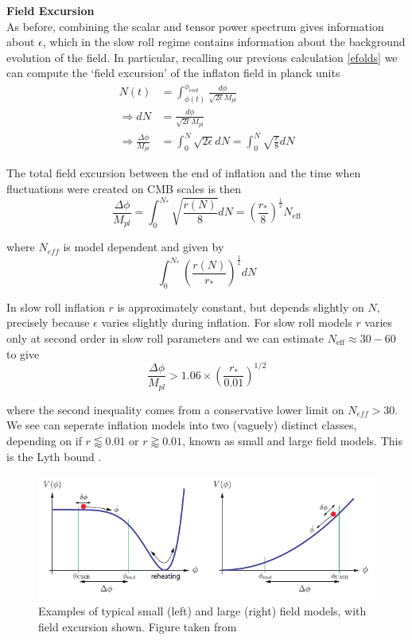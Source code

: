 \documentclass[a4paper,10pt]{article}
\newcommand{\Mp}{M_{pl}}
\newcommand{\half}{\frac{1}{2}}
\begin{document}
\textbf{Field Excursion}\\

As before, combining the scalar and tensor power spectrum gives information about $\epsilon$, which in the slow roll regime contains information about the background evolution of the field. In particular, recalling our previous calculation \ref{efolds} we can compute the `field excursion' of the inflaton field in planck units
\begin{equation}\begin{split}
N(t) &=  \int_{\phi(t)}^{\phi_{end}} \frac{d\phi}{\sqrt{2\epsilon}\Mp}\\
\Rightarrow dN&=\frac{d\phi}{\sqrt{2\epsilon}\Mp}\\
\Rightarrow \frac{\Delta \phi}{\Mp} &= \int_0^N \sqrt{2\epsilon} dN = \int_0^N \sqrt{\frac{r}{8}} dN 
\end{split}\end{equation}

The total field excursion between the end of inflation and the time when fluctuations were created on CMB scales is then 
\begin{equation}
\frac{\Delta \phi}{\Mp} =  \int_0^{N_*} \sqrt{\frac{r(N)}{8}} dN  = \left(\frac{r_*}{8}\right)^\half N_{\text{eff}}
\end{equation}

where $N_{eff}$ is model dependent and given by
\begin{equation}
\int_0^{N_*}\left(\frac{r(N)}{r_*}\right)^\half dN
\end{equation}

In slow roll inflation $r$ is approximately constant, but depends slightly on $N$, precisely because $\epsilon$ varies slightly during inflation. For slow roll models $r$ varies only at second order in slow roll parameters and we can estimate  $N_{\text{eff}} \approx 30-60$ to give
\begin{equation}
\frac{\Delta \phi}{\Mp} > 1.06 \times (\frac{r_*}{0.01})^{1/2}
\end{equation}

where the second inequality comes from a conservative lower limit on $N_{eff} > 30$. We see can seperate inflation models into two (vaguely) distinct classes, depending on if $r\lessapprox 0.01$ or $r\gtrapprox 0.01$, known as small and large field models. This is the Lyth bound \cite{Lyth}.\\


\begin{figure}[h]
  \includegraphics[width=0.7\linewidth]{smalllargefield.png}
  \centering
  \caption{Examples of typical small (left) and large (right) field models, with field excursion shown. Figure taken from \cite{baumannTASILecturesInflation2012}}
\end{figure}
\end{document}
